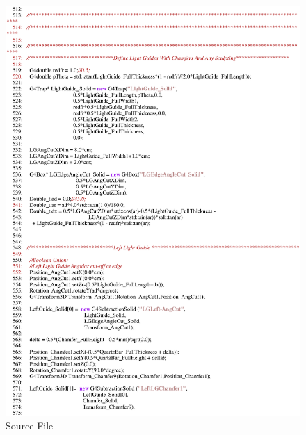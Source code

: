 \begin{figure}[ht]
  \hspace{0cm}
  \includegraphics[scale=0.8]{./figures5/QweakSimCerenkovDetector.cc-p9.eps}
  \caption{\label{SourceV9} Source File}
           \label{fig:V-SC-13}
\end{figure}
\clearpage

